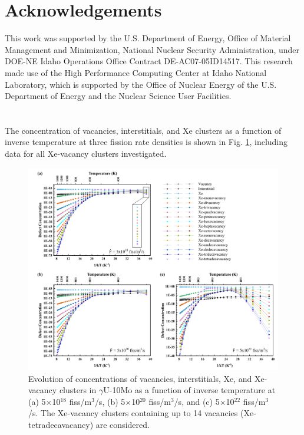 \documentclass[preprint,12pt]{elsarticle}
\begin{document}
\section{Acknowledgements}
This work was supported by the U.S. Department of Energy, Office of Material Management and Minimization, National Nuclear Security Administration, under DOE-NE Idaho Operations Office Contract DE-AC07-05ID14517. This research made use of the High Performance Computing Center at Idaho National Laboratory, which is supported by the Office of Nuclear Energy of the U.S. Department of Energy and the Nuclear Science User Facilities. 

\appendix
\section{}

\setcounter{figure}{0}

The concentration of vacancies, interstitials, and Xe clusters as a function of inverse temperature at three fission rate densities is shown in Fig. \ref{fig:FEBE}, including data for all Xe-vacancy clusters investigated.

\begin{figure}[hbt!]
\centering
\includegraphics[width=1\textwidth]{A1.png}
\caption{Evolution of concentrations of vacancies, interstitials, Xe, and Xe-vacancy clusters in $\gamma$U-10Mo as a function of inverse temperature at (a) 5$\times$10$^{18}$ fiss/m$^{3}$/s, (b) 5$\times$10$^{20}$ fiss/m$^{3}$/s, and (c) 5$\times$10$^{22}$ fiss/m$^{3}$/s. The Xe-vacancy clusters containing up to 14 vacancies (Xe-tetradecavacancy) are considered.}
\label{fig:FEBE}
\end{figure}


 

\end{document}
